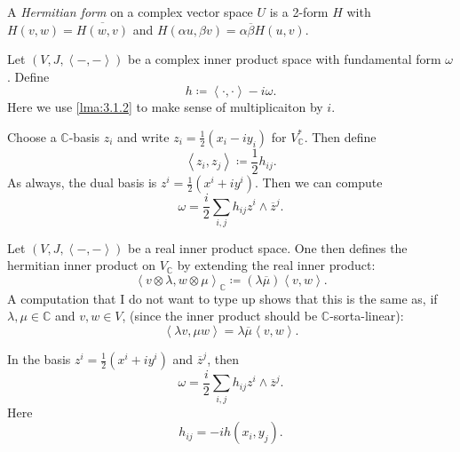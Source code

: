 \begin{definition}\label{dfn:3.1.20}
	A \emph{Hermitian form} on a complex vector space $U$ is a 2-form $H$ with $H(v,w)=\overline{H(w,v)} $ and $H(\alpha u,\beta v)=\alpha \overline{\beta } H(u,v)$.
\end{definition}

\begin{example}
	Let $(V,J,\left\langle -,- \right\rangle )$ be a complex inner product space with fundamental form $\omega $. Define
	\[
		h\coloneqq \left\langle \cdot ,\cdot  \right\rangle -i\omega 
	.\]
	Here we use \cref{lma:3.1.2} to make sense of multiplicaiton by $i$.

	Choose a $\mathbb{C} $-basis $z_i$ and write $z_i = \frac{1}{2} \left( x_i-iy_i \right) $ for $V^*_\mathbb{C} $. Then define
	\[
		\left\langle z_i,z_j \right\rangle \coloneqq \frac{1}{2} h_{ij} 
	.\]
	As always, the dual basis is $z^i = \frac{1}{2} \left( x^i + iy^i \right) $. Then we can compute
	\[
		\omega =\frac{i}{2} \sum_{i,j} h_{ij} z^i \wedge \overline{z} ^j
	.\]
\end{example}

\begin{example}
	Let $(V,J,\left\langle -,- \right\rangle )$ be a real inner product space. One then defines the hermitian inner product on $V_\mathbb{C} $ by extending the real inner product:
	\[
		\left\langle v\otimes \lambda ,w\otimes \mu  \right\rangle_\mathbb{C} \coloneqq (\lambda \overline{\mu } )\left\langle v,w \right\rangle 
	.\]
	A computation that I do not want to type up shows that this is the same as, if $\lambda ,\mu \in\mathbb{C} $ and $v,w\in V$, (since the inner product should be $\mathbb{C} $-sorta-linear):
	\[
		\left\langle \lambda v,\mu w \right\rangle =\lambda \overline{\mu } \left\langle v,w \right\rangle 
	.\]
\end{example}

In the basis $z^i = \frac{1}{2} \left( x^i + iy^i \right) $ and $\overline{z} ^j$, then
\[
	\omega =\frac{i}{2} \sum_{i,j} h_{ij} z^i \wedge \overline{z} ^j
.\]
Here
\[
	h_{ij} =-ih(x_i,y_j)
.\]

